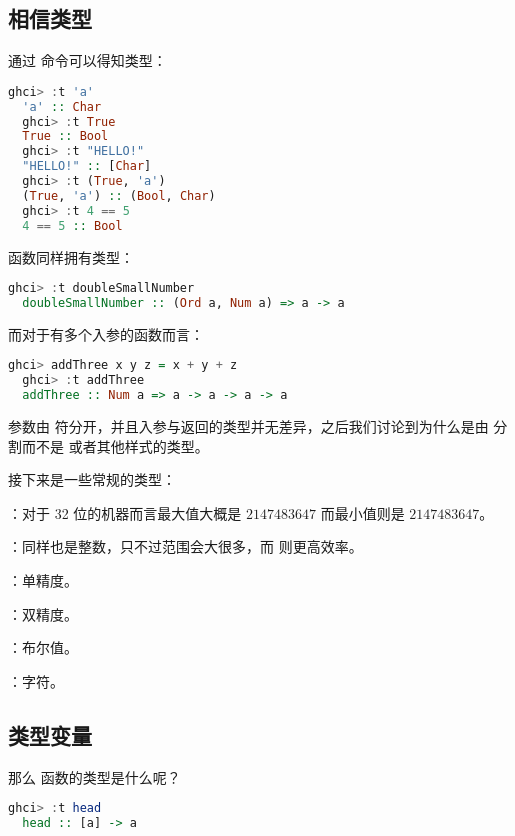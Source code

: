 \documentclass[./main.tex]{subfiles}
\begin{document}
\subsection*{相信类型}

通过  命令可以得知类型：

\begin{lstlisting}[language=Haskell]
  ghci> :t 'a'
  'a' :: Char
  ghci> :t True
  True :: Bool
  ghci> :t "HELLO!"
  "HELLO!" :: [Char]
  ghci> :t (True, 'a')
  (True, 'a') :: (Bool, Char)
  ghci> :t 4 == 5
  4 == 5 :: Bool
\end{lstlisting}

函数同样拥有类型：

\begin{lstlisting}[language=Haskell]
  ghci> :t doubleSmallNumber
  doubleSmallNumber :: (Ord a, Num a) => a -> a
\end{lstlisting}

而对于有多个入参的函数而言：

\begin{lstlisting}[language=Haskell]
  ghci> addThree x y z = x + y + z
  ghci> :t addThree
  addThree :: Num a => a -> a -> a -> a
\end{lstlisting}

参数由 \acode{->} 符分开，并且入参与返回的类型并无差异，之后我们讨论到为什么是由 \acode{->} 分割而不是
 或者其他样式的类型。

接下来是一些常规的类型：

：对于 32 位的机器而言最大值大概是 $2147483647$ 而最小值则是 $2147483647$。

：同样也是整数，只不过范围会大很多，而  则更高效率。

：单精度。

：双精度。

：布尔值。

：字符。

\subsection*{类型变量}

那么  函数的类型是什么呢？

\begin{lstlisting}[language=Haskell]
  ghci> :t head
  head :: [a] -> a
\end{lstlisting}
\end{document}
